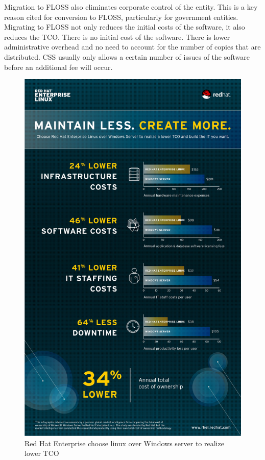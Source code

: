   Migration to FLOSS also eliminates corporate control of the entity. This is a key reason cited for conversion to FLOSS, particularly for government entities. Migrating to FLOSS
 not only reduces the initial costs of the software, it also reduces the \ac{TCO}. There is no initial cost of the software. There is lower administrative overhead and no need to account for the number of copies that are distributed. CSS usually only allows a certain number of issues of the software before an additional fee will occur.  
  \begin{figure}[H]
     \begin{center}
        \includegraphics[scale=0.4]{img/RHELFancy.png}
       \caption[Red Hat realize lower TCO] {Red Hat Enterprise choose linux over Windows server to realize lower TCO \protect\footnotemark}
       \label{fig:RedHat}
     \end{center}
       \end{figure}
